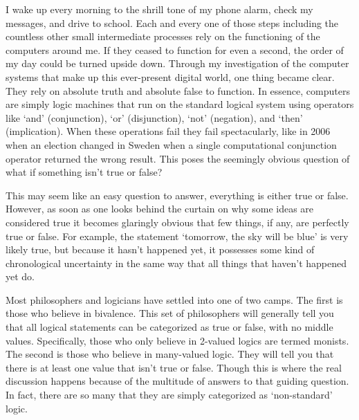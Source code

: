 \documentclass{article}
\begin{document}
\newpage

I wake up every morning to the shrill tone of my phone alarm, check my messages, and drive to school. Each and every one of those steps including the countless other small intermediate processes rely on the functioning of the computers around me. If they ceased to function for even a second, the order of my day could be turned upside down. Through my investigation of the computer systems that make up this ever-present digital world, one thing became clear. They rely on absolute truth and absolute false to function. In essence, computers are simply logic machines that run on the standard logical system using operators like ‘and’ (conjunction), ‘or’ (disjunction), ‘not’ (negation), and ‘then’ (implication). When these operations fail they fail spectacularly, like in 2006 when an election changed in Sweden when a single computational conjunction operator returned the wrong result. This poses the seemingly obvious question of what if something isn’t true or false?

This may seem like an easy question to answer, everything is either true or false. However, as soon as one looks behind the curtain on why some ideas are considered true it becomes glaringly obvious that few things, if any, are perfectly true or false. For example, the statement ‘tomorrow, the sky will be blue’ is very likely true, but because it hasn’t happened yet, it possesses some kind of chronological uncertainty in the same way that all things that haven’t happened yet do. 

Most philosophers and logicians have settled into one of two camps. The first is those who believe in bivalence. This set of philosophers will generally tell you that all logical statements can be categorized as true or false, with no middle values. Specifically, those who only believe in 2-valued logics are termed monists. The second is those who believe in many-valued logic. They will tell you that there is at least one value that isn’t true or false. Though this is where the real discussion happens because of the multitude of answers to that guiding question. In fact, there are so many that they are simply categorized as ‘non-standard’ logic. 
\end{document}
